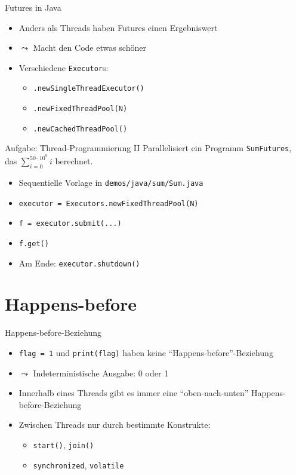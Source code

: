 \documentclass{beamer}
\newcommand{\code}[1]{
	\begin{mdframed}
		
	\end{mdframed}
}
\begin{document}
\begin{frame}{Futures in Java}
    \code{code/futures.java}

    \begin{itemize}
        \item Anders als Threads haben Futures einen Ergebniswert
        \item $\leadsto$ Macht den Code etwas schöner
        \item Verschiedene \texttt{Executor}s:
        \begin{itemize}
            \item \texttt{.newSingleThreadExecutor()}
            \item \texttt{.newFixedThreadPool(N)}
            \item \texttt{.newCachedThreadPool()}
        \end{itemize}
    \end{itemize}
\end{frame}

\begin{frame}{Aufgabe: Thread-Programmierung II}
    Parallelisiert ein Programm \texttt{SumFutures}, das $\sum^{50 \cdot 10^9}_{i = 0} i$ berechnet.

    \begin{itemize}
        \item Sequentielle Vorlage in \texttt{demos/java/sum/Sum.java}
        \item \texttt{executor = Executors.newFixedThreadPool(N)}
        \item \texttt{f = executor.submit(...)}
        \item \texttt{f.get()}
        \item Am Ende: \texttt{executor.shutdown()}
    \end{itemize}
\end{frame}

\section{Happens-before}

\begin{frame}{Happens-before-Beziehung}
  \code{code/happens-before.java}

  \begin{itemize}
    \item \texttt{flag = 1} und \texttt{print(flag)} haben keine \enquote{Happens-before}-Beziehung
    \item $\leadsto$ Indeterministische Ausgabe: 0 oder 1
    \item Innerhalb eines Threads gibt es immer eine \enquote{oben-nach-unten} Happens-before-Beziehung
    \item Zwischen Threads nur durch bestimmte Konstrukte:
    \begin{itemize}
      \item \texttt{start()}, \texttt{join()}
      \item \texttt{synchronized}, \texttt{volatile}
    \end{itemize}
  \end{itemize}
\end{frame}
\end{document}
